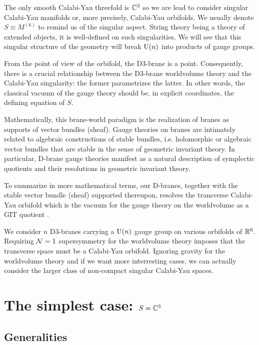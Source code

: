 \documentclass[a4paper,11pt]{article}
\begin{document}
    The only smooth Calabi-Yau threefold is $\mathbb{C}^3$ so we are lead to consider singular Calabi-Yau manifolds or, more precisely, Calabi-Yau orbifolds. We usually denote $S\equiv M^{(6)}$ to remind us of the singular aspect. String theory being a theory of extended objects, it is well-defined on such singularities. We will see that this singular structure of the geometry will break $\text{U}(n)$ into products of gauge groups.
    
    From the point of view of the orbifold, the D$3$-brane is a point. Consequently, there is a crucial relationship between the D$3$-brane worldvolume theory and the Calabi-Yau singularity: the former parametrizes the latter. In other words, the classical vacuum of the gauge theory should be, in explicit coordinates, the defining equation of $S$.

    Mathematically, this brane-world paradigm is the realization of branes as supports of vector bundles (sheaf). Gauge theories on branes are intimately related to algebraic constructions of stable bundles, i.e. holomorphic or algebraic vector bundles that are stable in the sense of geometric invariant theory. In particular, D-brane gauge theories manifest as a natural description of symplectic quotients and their resolutions in geometric invariant theory.

    To summarize in more mathematical terms, our D-branes, together with the stable vector bundle (sheaf) supported thereupon, resolves the transverse Calabi-Yau orbifold which is the vacuum for the gauge theory on the worldvolume as a GIT quotient \marker.

    \begin{result}
        We consider $n$ D$3$-branes carrying a $\text{U}(n)$ gauge group on various orbifolds of $\mathbb{R}^6$. Requiring $\mathcal{N}=1$ supersymmetry for the worldvolume theory imposes that the transverse space must be a Calabi-Yau orbifold. Ignoring gravity for the worldvolume theory and if we want more interresting cases, we can actually consider the larger class of non-compact singular Calabi-Yau spaces.
    \end{result}
    

\section{The simplest case: $S=\mathbb{C}^3$}

    \subsection{Generalities}
\end{document}
